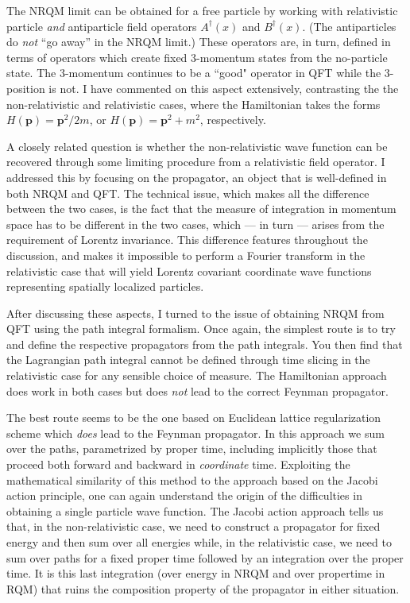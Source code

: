 \documentclass{article}
\begin{document}
The NRQM limit can be obtained for a free particle by working with relativistic particle \textit{and} antiparticle field operators
$A^\dagger(x)$ and $B^\dagger(x)$. (The antiparticles do \textit{not} ``go away'' in the NRQM limit.) These operators are, in turn, defined in terms of operators which create fixed 3-momentum states from the no-particle state. The 3-momentum continues to be a ``good" operator in QFT while the 3-position is not. I have commented on this aspect extensively, contrasting  the 
the non-relativistic and relativistic cases, where the Hamiltonian takes the forms $H(\bm{p}) = \bm{p}^2 /2m$, or $H(\bm{p}) = \bm{p}^2 + m^2$, respectively. 

A closely related question is whether the non-relativistic wave function can be recovered through some limiting
procedure from a relativistic field operator. I addressed this  by focusing
on the propagator, an object that is well-defined in both NRQM and QFT. The technical issue, which makes all the difference between the two cases, is the fact that the measure of integration in momentum space has to be different in the two cases, which --- in turn --- arises from the requirement of Lorentz invariance.  This difference features  throughout the discussion, and makes it 
 impossible to perform a Fourier transform in the relativistic
case that will yield Lorentz covariant coordinate wave functions  representing spatially localized
particles.  

After discussing these aspects, I turned to the   issue of obtaining NRQM from QFT using the path integral formalism. Once again, the simplest route is to try and define the respective propagators from the path integrals. You then find that  the Lagrangian path integral cannot be defined through time slicing  in the relativistic
case for any sensible choice of measure. The Hamiltonian approach does work in both cases but does \textit{not} lead to the correct Feynman propagator.  

The best route seems to be the one based on  Euclidean lattice regularization scheme which \textit{does} lead to the Feynman propagator. In this approach we sum over the paths, parametrized
 by proper time,  including implicitly those that proceed both forward and backward in \textit{coordinate}
time. Exploiting the mathematical similarity of this method to  the approach based on the Jacobi action principle, one can again understand the origin of the difficulties in obtaining a single particle wave function. The Jacobi action approach tells us that, in the non-relativistic case, we need to 
construct  a propagator for fixed energy and then  sum over all energies while, in  the relativistic case, we need to sum over 
paths  for a fixed proper time followed by an integration over the proper time. It is
this last integration (over energy in NRQM and over propertime in RQM) that ruins the composition property of the propagator in either situation. 
\end{document}
